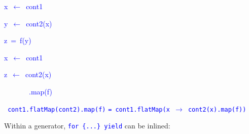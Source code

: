 \texttt{\textcolor{blue}{\footnotesize{}}}%
\begin{minipage}[c][1\totalheight][t]{0.49\columnwidth}%
\begin{lyxcode}
\textcolor{blue}{\footnotesize{}x~$\leftarrow$~cont1}{\footnotesize\par}

\textcolor{blue}{\footnotesize{}y~$\leftarrow$~cont2(x)}{\footnotesize\par}

\textcolor{blue}{\footnotesize{}z~=~f(y)}{\footnotesize\par}
\end{lyxcode}
%
\end{minipage}\texttt{\textcolor{blue}{\footnotesize{}\hfill{}}}%
\begin{minipage}[c][1\totalheight][t]{0.49\columnwidth}%
\begin{lyxcode}
\textcolor{blue}{\footnotesize{}x~$\leftarrow$~cont1}{\footnotesize\par}

\textcolor{blue}{\footnotesize{}z~$\leftarrow$~cont2(x)}{\footnotesize\par}

\textcolor{blue}{\footnotesize{}~~~~~~~.map(f)}{\footnotesize\par}
\end{lyxcode}
%
\end{minipage}\texttt{\textcolor{blue}{\footnotesize{}\hfill{}\medskip{}
cont1.flatMap(cont2).map(f)}} \texttt{\textcolor{blue}{\footnotesize{}=
cont1.flatMap(x $\rightarrow$ cont2(x).map(f))}} 

Within a generator, \texttt{\textcolor{blue}{\footnotesize{}for \{...\}
yield}} can be inlined:

